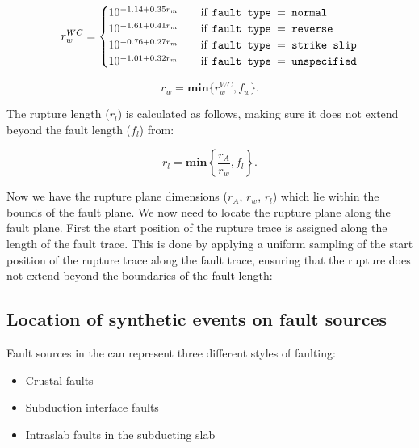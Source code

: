 \begin{equation}\label{rw}
r_w^{WC} = 
\begin{cases}
10^{-1.14 + 0.35r_m}	& \quad \mbox{if \texttt{fault type $=$  normal}} \\
10^{-1.61 + 0.41r_m}	& \quad \mbox{if \texttt{fault type $=$  reverse}} \\
10^{-0.76 + 0.27r_m}	& \quad \mbox{if \texttt{fault type $=$  strike slip}} \\
10^{-1.01 + 0.32r_m}	& \quad \mbox{if \texttt{fault type $=$  unspecified}} \\
\end{cases}
\end{equation}

\begin{equation} \label{eq:rw}
r_w = \mathbf{min}\{r_w^{WC}, f_w\} .
\end{equation}

The rupture length ($r_l$) is calculated as follows, making sure it does not extend beyond the fault length ($f_l$) from:

\begin{equation}
r_l = \mathbf{min}\left\{\frac{r_A}{r_w}, f_l\right\} .
\end{equation}

Now we have the rupture plane dimensions ($r_A$, $r_w$, $r_l$) which lie within the bounds of the fault plane. We now need to locate the rupture plane along the fault plane. 
First the start position of the rupture trace is assigned along the length of the fault trace. 
This is done by applying a uniform sampling of the start position of the rupture trace along the fault trace, ensuring that the rupture does not extend 
beyond the boundaries of the fault length:


\subsection{Location of synthetic events on fault sources}
\label{sec:fault_locn}

Fault sources in the  can represent three different styles of faulting:

\begin{itemize}
\item Crustal faults
\item Subduction interface faults
\item Intraslab faults in the subducting slab
\end{itemize}

